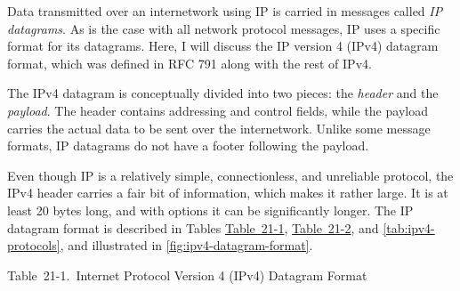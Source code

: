 Data transmitted over an internetwork using IP is carried in messages
called \emph{IP datagrams}. As is the case with all network protocol
messages, IP uses a specific
format for
its datagrams. Here, I will discuss the IP version 4 (IPv4) datagram
format,
which was defined in RFC 791 along with the rest of IPv4.

The IPv4 datagram is conceptually divided into two pieces: the
\emph{header} and the \emph{payload}. The header contains addressing
and control fields, while the payload carries the actual data to be sent
over the internetwork. Unlike some message formats, IP datagrams do not
have a footer following the payload.

Even though IP is a relatively simple, connectionless, and unreliable protocol, the IPv4 header carries a fair bit of information, which makes it rather large.
It is at least 20 bytes long, and with options it can be significantly longer.
The IP datagram format is described in Tables
\protect\hyperlink{ch21s02.htmlux5cux23internet_protocol_version__ipv_datagram}{Table~21-1},
\protect\hyperlink{ch21s02.htmlux5cux23ipv_flags_subfields}{Table~21-2},
and \cref{tab:ipv4-protocols}, and illustrated in \cref{fig:ipv4-datagram-format}.



Table~21-1.~Internet Protocol Version 4 (IPv4) Datagram Format

